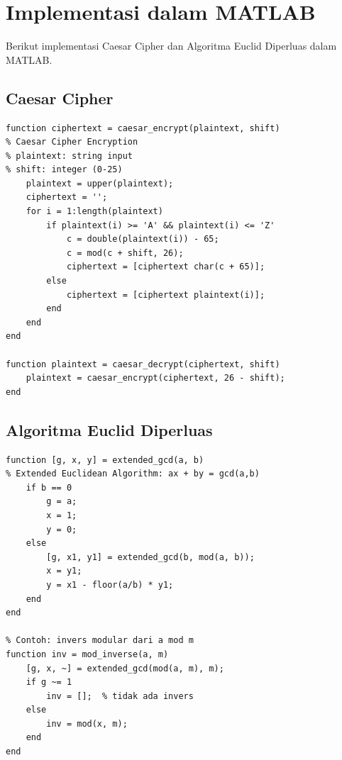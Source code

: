 \section{Implementasi dalam MATLAB}

Berikut implementasi Caesar Cipher dan Algoritma Euclid Diperluas dalam MATLAB.

\subsection{Caesar Cipher}
\begin{lstlisting}[style=matlab,caption={Implementasi Caesar Cipher dalam MATLAB}]
function ciphertext = caesar_encrypt(plaintext, shift)
% Caesar Cipher Encryption
% plaintext: string input
% shift: integer (0-25)
    plaintext = upper(plaintext);
    ciphertext = '';
    for i = 1:length(plaintext)
        if plaintext(i) >= 'A' && plaintext(i) <= 'Z'
            c = double(plaintext(i)) - 65;
            c = mod(c + shift, 26);
            ciphertext = [ciphertext char(c + 65)];
        else
            ciphertext = [ciphertext plaintext(i)];
        end
    end
end

function plaintext = caesar_decrypt(ciphertext, shift)
    plaintext = caesar_encrypt(ciphertext, 26 - shift);
end
\end{lstlisting}

\subsection{Algoritma Euclid Diperluas}
\begin{lstlisting}[style=matlab,caption={Extended Euclidean Algorithm dalam MATLAB}]
function [g, x, y] = extended_gcd(a, b)
% Extended Euclidean Algorithm: ax + by = gcd(a,b)
    if b == 0
        g = a;
        x = 1;
        y = 0;
    else
        [g, x1, y1] = extended_gcd(b, mod(a, b));
        x = y1;
        y = x1 - floor(a/b) * y1;
    end
end

% Contoh: invers modular dari a mod m
function inv = mod_inverse(a, m)
    [g, x, ~] = extended_gcd(mod(a, m), m);
    if g ~= 1
        inv = [];  % tidak ada invers
    else
        inv = mod(x, m);
    end
end
\end{lstlisting}
